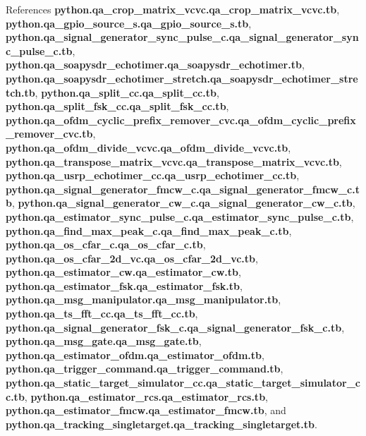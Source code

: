 References {\bf python.\+qa\+\_\+crop\+\_\+matrix\+\_\+vcvc.\+qa\+\_\+crop\+\_\+matrix\+\_\+vcvc.\+tb}, {\bf python.\+qa\+\_\+gpio\+\_\+source\+\_\+s.\+qa\+\_\+gpio\+\_\+source\+\_\+s.\+tb}, {\bf python.\+qa\+\_\+signal\+\_\+generator\+\_\+sync\+\_\+pulse\+\_\+c.\+qa\+\_\+signal\+\_\+generator\+\_\+sync\+\_\+pulse\+\_\+c.\+tb}, {\bf python.\+qa\+\_\+soapysdr\+\_\+echotimer.\+qa\+\_\+soapysdr\+\_\+echotimer.\+tb}, {\bf python.\+qa\+\_\+soapysdr\+\_\+echotimer\+\_\+stretch.\+qa\+\_\+soapysdr\+\_\+echotimer\+\_\+stretch.\+tb}, {\bf python.\+qa\+\_\+split\+\_\+cc.\+qa\+\_\+split\+\_\+cc.\+tb}, {\bf python.\+qa\+\_\+split\+\_\+fsk\+\_\+cc.\+qa\+\_\+split\+\_\+fsk\+\_\+cc.\+tb}, {\bf python.\+qa\+\_\+ofdm\+\_\+cyclic\+\_\+prefix\+\_\+remover\+\_\+cvc.\+qa\+\_\+ofdm\+\_\+cyclic\+\_\+prefix\+\_\+remover\+\_\+cvc.\+tb}, {\bf python.\+qa\+\_\+ofdm\+\_\+divide\+\_\+vcvc.\+qa\+\_\+ofdm\+\_\+divide\+\_\+vcvc.\+tb}, {\bf python.\+qa\+\_\+transpose\+\_\+matrix\+\_\+vcvc.\+qa\+\_\+transpose\+\_\+matrix\+\_\+vcvc.\+tb}, {\bf python.\+qa\+\_\+usrp\+\_\+echotimer\+\_\+cc.\+qa\+\_\+usrp\+\_\+echotimer\+\_\+cc.\+tb}, {\bf python.\+qa\+\_\+signal\+\_\+generator\+\_\+fmcw\+\_\+c.\+qa\+\_\+signal\+\_\+generator\+\_\+fmcw\+\_\+c.\+tb}, {\bf python.\+qa\+\_\+signal\+\_\+generator\+\_\+cw\+\_\+c.\+qa\+\_\+signal\+\_\+generator\+\_\+cw\+\_\+c.\+tb}, {\bf python.\+qa\+\_\+estimator\+\_\+sync\+\_\+pulse\+\_\+c.\+qa\+\_\+estimator\+\_\+sync\+\_\+pulse\+\_\+c.\+tb}, {\bf python.\+qa\+\_\+find\+\_\+max\+\_\+peak\+\_\+c.\+qa\+\_\+find\+\_\+max\+\_\+peak\+\_\+c.\+tb}, {\bf python.\+qa\+\_\+os\+\_\+cfar\+\_\+c.\+qa\+\_\+os\+\_\+cfar\+\_\+c.\+tb}, {\bf python.\+qa\+\_\+os\+\_\+cfar\+\_\+2d\+\_\+vc.\+qa\+\_\+os\+\_\+cfar\+\_\+2d\+\_\+vc.\+tb}, {\bf python.\+qa\+\_\+estimator\+\_\+cw.\+qa\+\_\+estimator\+\_\+cw.\+tb}, {\bf python.\+qa\+\_\+estimator\+\_\+fsk.\+qa\+\_\+estimator\+\_\+fsk.\+tb}, {\bf python.\+qa\+\_\+msg\+\_\+manipulator.\+qa\+\_\+msg\+\_\+manipulator.\+tb}, {\bf python.\+qa\+\_\+ts\+\_\+fft\+\_\+cc.\+qa\+\_\+ts\+\_\+fft\+\_\+cc.\+tb}, {\bf python.\+qa\+\_\+signal\+\_\+generator\+\_\+fsk\+\_\+c.\+qa\+\_\+signal\+\_\+generator\+\_\+fsk\+\_\+c.\+tb}, {\bf python.\+qa\+\_\+msg\+\_\+gate.\+qa\+\_\+msg\+\_\+gate.\+tb}, {\bf python.\+qa\+\_\+estimator\+\_\+ofdm.\+qa\+\_\+estimator\+\_\+ofdm.\+tb}, {\bf python.\+qa\+\_\+trigger\+\_\+command.\+qa\+\_\+trigger\+\_\+command.\+tb}, {\bf python.\+qa\+\_\+static\+\_\+target\+\_\+simulator\+\_\+cc.\+qa\+\_\+static\+\_\+target\+\_\+simulator\+\_\+cc.\+tb}, {\bf python.\+qa\+\_\+estimator\+\_\+rcs.\+qa\+\_\+estimator\+\_\+rcs.\+tb}, {\bf python.\+qa\+\_\+estimator\+\_\+fmcw.\+qa\+\_\+estimator\+\_\+fmcw.\+tb}, and {\bf python.\+qa\+\_\+tracking\+\_\+singletarget.\+qa\+\_\+tracking\+\_\+singletarget.\+tb}.

